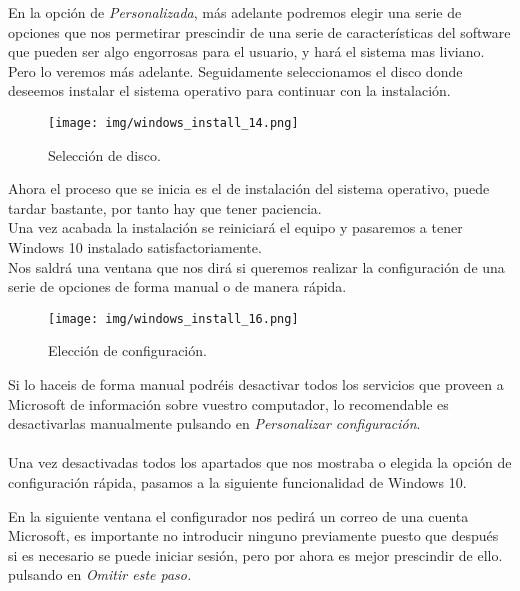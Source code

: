 \documentclass[12pt]{article}
\begin{document}
      En la opción de \textit{Personalizada}, más adelante podremos elegir una serie de opciones que nos permetirar 
      prescindir de una serie de características del software que pueden ser algo engorrosas para el usuario, y hará 
      el sistema mas liviano. Pero lo veremos más adelante. Seguidamente seleccionamos el disco donde deseemos instalar 
      el sistema operativo para continuar con la instalación.

      \begin{figure}[h]
        \centering
        \texttt{[image: img/windows\_install\_14.png]}
        \caption{Selección de disco.}
        \label{Windows9}
      \end{figure}
    
      \newpage

      Ahora el proceso que se inicia es el de instalación del sistema operativo, puede tardar bastante, por tanto hay que 
      tener paciencia.\\
      Una vez acabada la instalación se reiniciará el equipo y pasaremos a tener Windows 10 instalado satisfactoriamente.\\
      Nos saldrá una ventana que nos dirá si queremos realizar la configuración de una serie de opciones de forma manual o de 
      manera rápida.

      \begin{figure}[h]
        \centering
        \texttt{[image: img/windows\_install\_16.png]}
        \caption{Elección de configuración.}
        \label{Windows10}
      \end{figure}

      Si lo haceis de forma manual podréis desactivar todos los servicios que proveen a Microsoft de información sobre vuestro 
      computador, lo recomendable es desactivarlas manualmente pulsando en \textit{Personalizar configuración}.
      \\\\
      Una vez desactivadas todos los apartados que nos mostraba o elegida la opción de configuración rápida, pasamos a la siguiente 
      funcionalidad de Windows 10.

      \newpage

      En la siguiente ventana el configurador nos pedirá un correo de una cuenta Microsoft, es importante no introducir ninguno previamente 
      puesto que después si es necesario se puede iniciar sesión, pero por ahora es mejor prescindir de ello. pulsando en \textit{Omitir este paso.}
\end{document}

